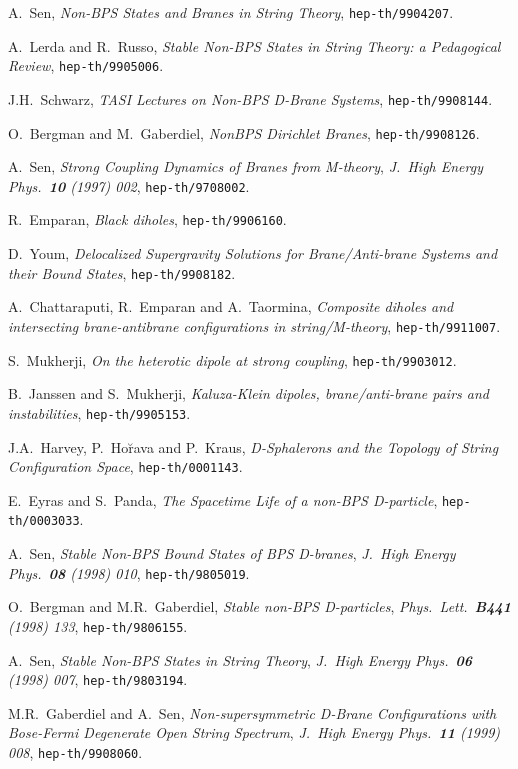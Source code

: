 \documentclass[12pt,a4paper]{article}
\begin{document}
\begin{thebibliography}{99}


A.~Sen, {\sl Non-BPS States and Branes in String Theory},
{\tt hep-th/9904207}.

A.~Lerda and R.~Russo, {\sl Stable Non-BPS States in String Theory: a
Pedagogical Review}, {\tt hep-th/9905006}.

J.H.~Schwarz, {\sl TASI Lectures on Non-BPS D-Brane Systems},
{\tt hep-th/9908144}.

O.~Bergman and M.~Gaberdiel, {\sl NonBPS Dirichlet Branes},
{\tt hep-th/9908126}.


A.~Sen, {\sl Strong Coupling Dynamics of Branes from M-theory},
{\it J.~High Energy Phys.~{\bf 10} (1997) 002},
{\tt hep-th/9708002}.

R.~Emparan, {\sl Black diholes}, {\tt hep-th/9906160}.

D.~Youm, {\sl Delocalized Supergravity Solutions for Brane/Anti-brane
Systems and their Bound States}, {\tt hep-th/9908182}.

A.~Chattaraputi, R.~Emparan and A.~Taormina, {\sl Composite
diholes and intersecting brane-antibrane configurations in
string/M-theory}, {\tt hep-th/9911007}. 

S.~Mukherji, {\sl On the heterotic dipole at strong coupling},
{\tt hep-th/9903012}.

B.~Janssen and S.~Mukherji, {\sl Kaluza-Klein dipoles, brane/anti-brane
pairs and instabilities}, {\tt hep-th/9905153}.

J.A.~Harvey, P.~Ho\u{r}ava and P.~Kraus, {\sl D-Sphalerons and the
Topology of String Configuration Space}, {\tt hep-th/0001143}.


E.~Eyras and S.~Panda, {\sl The Spacetime Life of a non-BPS 
D-particle}, {\tt hep-th/0003033}.

A.~Sen, {\sl Stable Non-BPS Bound States of BPS D-branes},
{\it J.~High Energy Phys.~{\bf 08} (1998) 010},
{\tt hep-th/9805019}.

O.~Bergman and M.R.~Gaberdiel, {\sl Stable non-BPS D-particles},
{\it Phys.~Lett.~{\bf B441} (1998) 133},
{\tt hep-th/9806155}.

A.~Sen, {\sl Stable Non-BPS States in String Theory},
{\it J.~High Energy Phys.~{\bf 06} (1998) 007}, {\tt hep-th/9803194}.

M.R.~Gaberdiel and A.~Sen, {\sl Non-supersymmetric D-Brane
Configurations with Bose-Fermi Degenerate Open String Spectrum},
{\it J.~High Energy Phys.~{\bf 11} (1999) 008}, {\tt hep-th/9908060}.


\end{thebibliography}
\end{document}

